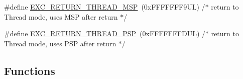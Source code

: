 \begin{DoxyCompactItemize}
\item 
\#define \hyperlink{group___c_m_s_i_s___core___n_v_i_c_functions_gaea4703101b5e679f695e231f7ee72331}{E\+X\+C\+\_\+\+R\+E\+T\+U\+R\+N\+\_\+\+T\+H\+R\+E\+A\+D\+\_\+\+M\+SP}~(0x\+F\+F\+F\+F\+F\+F\+F9\+U\+L)     /$\ast$ return to Thread mode, uses M\+S\+P after return                                $\ast$/
\item 
\#define \hyperlink{group___c_m_s_i_s___core___n_v_i_c_functions_ga9998daf0fbdf31dbc8f81cd604b58175}{E\+X\+C\+\_\+\+R\+E\+T\+U\+R\+N\+\_\+\+T\+H\+R\+E\+A\+D\+\_\+\+P\+SP}~(0x\+F\+F\+F\+F\+F\+F\+F\+D\+U\+L)     /$\ast$ return to Thread mode, uses P\+S\+P after return                                $\ast$/
\end{DoxyCompactItemize}
\subsection*{Functions}
